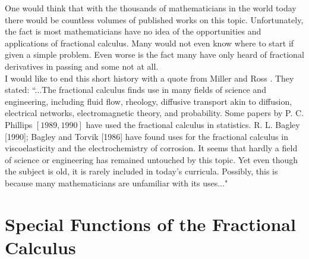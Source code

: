 \documentclass[a4paper,14pt,oneside]{book}
\theoremstyle{plain}
\theoremstyle{definition}
\theoremstyle{remark}
\begin{document}
\begin{center}
\begin{flushleft}
{\par{One would think that with the thousands of mathematicians in the world today there would be countless volumes of published works on this topic. Unfortunately, the fact is most mathematicians have no idea of the opportunities and applications of fractional calculus. Many would not even know where to start if given a simple problem. Even worse is the fact many have only heard of fractional derivatives in passing and some not at all.\\\hspace{2cm}I would like to end this short history with a quote from Miller and Ross \cite{bb10}. They stated: \textquotedblleft ...The fractional calculus finds use in many fields of science and engineering, including fluid flow, rheology, diffusive transport akin to diffusion, electrical networks, electromagnetic theory, and probability. Some papers by P. C. Phillips $[1989, 1990]$ have used the fractional calculus in statistics. R. L. Bagley [1990]; Bagley and Torvik [1986] have found uses for the fractional calculus in viscoelasticity and the electrochemistry of corrosion. It seems that hardly a field of science or engineering has remained untouched by this topic. Yet even though the subject is old, it is rarely included in today's curricula. Possibly, this is because many mathematicians are unfamiliar with its uses..."\\}}
\end{flushleft}        \end{center}

\newpage
         \chapter{Special Functions of the Fractional Calculus}
\end{document}
